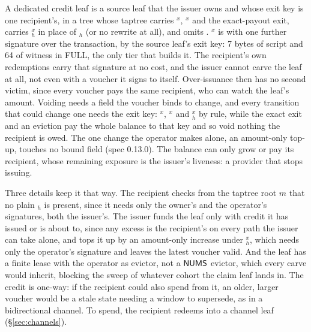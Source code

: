 A dedicated credit leaf is a source leaf that the issuer owns and whose
exit key is one recipient's, in a tree whose taptree carries
$^{x}$, $^{x}$ and the exact-payout exit, carries
$_h^{x}$ in place of $_h$ (or no rewrite at all),
and omits . $^{x}$ is  with one further
signature over the transaction, by the source leaf's exit key: 7 bytes
of script and 64 of witness in FULL, the only tier that builds it. The
recipient's own redemptions carry that signature at no cost, and the
issuer cannot carve the leaf at all, not even with a voucher it signs to
itself. Over-issuance then has no second victim, since every voucher
pays the same recipient, who can watch the leaf's amount. Voiding needs
a field the voucher binds to change, and every transition that could
change one needs the exit key: $^{x}$, $^{x}$ and
$_h^{x}$ by rule, while the exact exit and an eviction pay
the whole balance to that key and so void nothing the recipient is
owed. The one change the operator makes alone, an amount-only top-up,
touches no bound field (spec 0.13.0). The balance can only grow or pay its recipient, whose remaining
exposure is the issuer's liveness: a provider that stops issuing.

Three details keep it that way. The recipient checks from the taptree
root $m$ that no plain $_h$ is present, since it needs only
the owner's and the operator's signatures, both the issuer's. The issuer
funds the leaf only with credit it has issued or is about to, since any
excess is the recipient's on every path the issuer can take alone, and
tops it up by an amount-only increase under $_h^{x}$, which
needs only the operator's signature and leaves the latest voucher
valid. And the leaf has a finite lease
with the operator as evictor, not a $\mathsf{NUMS}$ evictor, which every carve
would inherit, blocking the sweep of whatever cohort the claim leaf lands
in. The credit is one-way: if the recipient could also spend from it, an
older, larger voucher would be a stale state needing a window to
supersede, as in a bidirectional channel. To spend, the recipient
redeems into a channel leaf (\S\ref{sec:channels}).
